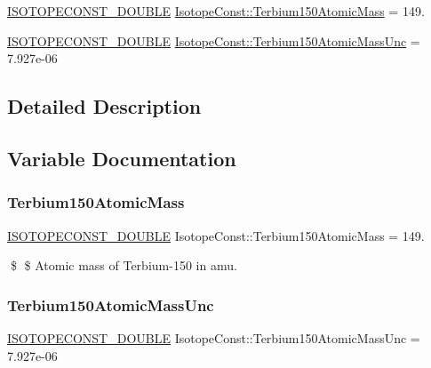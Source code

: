 \begin{DoxyCompactItemize}
\item 
\mbox{\hyperlink{group___isotope_const-_macros_ga8f45a7272ce02c0b4c65c44636ed719a}{I\+S\+O\+T\+O\+P\+E\+C\+O\+N\+S\+T\+\_\+\+D\+O\+U\+B\+LE}} \mbox{\hyperlink{group___isotope_const-_terbium-_tb150_gaca67d910bfc267f2983fa73d83ed3f8d}{Isotope\+Const\+::\+Terbium150\+Atomic\+Mass}} = 149.
\item 
\mbox{\hyperlink{group___isotope_const-_macros_ga8f45a7272ce02c0b4c65c44636ed719a}{I\+S\+O\+T\+O\+P\+E\+C\+O\+N\+S\+T\+\_\+\+D\+O\+U\+B\+LE}} \mbox{\hyperlink{group___isotope_const-_terbium-_tb150_ga854841569657fa30afe5a43e51e0e08e}{Isotope\+Const\+::\+Terbium150\+Atomic\+Mass\+Unc}} = 7.\+927e-\/06
\end{DoxyCompactItemize}


\subsection{Detailed Description}


\subsection{Variable Documentation}
\mbox{\label{group___isotope_const-_terbium-_tb150_gaca67d910bfc267f2983fa73d83ed3f8d}} 
\subsubsection{\texorpdfstring{Terbium150\+Atomic\+Mass}{Terbium150AtomicMass}}
{\footnotesize\ttfamily \mbox{\hyperlink{group___isotope_const-_macros_ga8f45a7272ce02c0b4c65c44636ed719a}{I\+S\+O\+T\+O\+P\+E\+C\+O\+N\+S\+T\+\_\+\+D\+O\+U\+B\+LE}} Isotope\+Const\+::\+Terbium150\+Atomic\+Mass = 149.}

\$ \$ Atomic mass of Terbium-\/150 in amu. \mbox{\label{group___isotope_const-_terbium-_tb150_ga854841569657fa30afe5a43e51e0e08e}} 
\subsubsection{\texorpdfstring{Terbium150\+Atomic\+Mass\+Unc}{Terbium150AtomicMassUnc}}
{\footnotesize\ttfamily \mbox{\hyperlink{group___isotope_const-_macros_ga8f45a7272ce02c0b4c65c44636ed719a}{I\+S\+O\+T\+O\+P\+E\+C\+O\+N\+S\+T\+\_\+\+D\+O\+U\+B\+LE}} Isotope\+Const\+::\+Terbium150\+Atomic\+Mass\+Unc = 7.\+927e-\/06}


